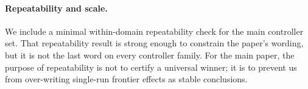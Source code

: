 \paragraph{Repeatability and scale.}
We include a minimal within-domain repeatability check for the main controller set.
That repeatability result is strong enough to constrain the paper's wording, but it is not the last word on every controller family.
For the main paper, the purpose of repeatability is not to certify a universal winner; it is to prevent us from over-writing single-run frontier effects as stable conclusions.

